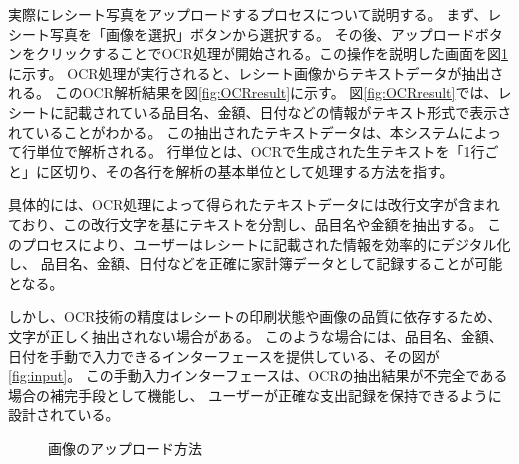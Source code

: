 \documentclass[main]{subfiles}
\begin{document}

実際にレシート写真をアップロードするプロセスについて説明する。
まず、レシート写真を「画像を選択」ボタンから選択する。
その後、アップロードボタンをクリックすることでOCR処理が開始される。この操作を説明した画面を図\ref{fig:upload}に示す。
OCR処理が実行されると、レシート画像からテキストデータが抽出される。
このOCR解析結果を図\ref{fig:OCRresult}に示す。
図\ref{fig:OCRresult}では、レシートに記載されている品目名、金額、日付などの情報がテキスト形式で表示されていることがわかる。
この抽出されたテキストデータは、本システムによって行単位で解析される。
行単位とは、OCRで生成された生テキストを「1行ごと」に区切り、その各行を解析の基本単位として処理する方法を指す。

具体的には、OCR処理によって得られたテキストデータには改行文字が含まれており、この改行文字を基にテキストを分割し、品目名や金額を抽出する。
このプロセスにより、ユーザーはレシートに記載された情報を効率的にデジタル化し、
品目名、金額、日付などを正確に家計簿データとして記録することが可能となる。

しかし、OCR技術の精度はレシートの印刷状態や画像の品質に依存するため、文字が正しく抽出されない場合がある。
このような場合には、品目名、金額、日付を手動で入力できるインターフェースを提供している、その図が\ref{fig:input}。
この手動入力インターフェースは、OCRの抽出結果が不完全である場合の補完手段として機能し、
ユーザーが正確な支出記録を保持できるように設計されている。

\begin{figure}[tb]
    \begin{center}
        \caption{画像のアップロード方法}
        \label{fig:upload}
    \end{center}
\end{figure}
\end{document}
